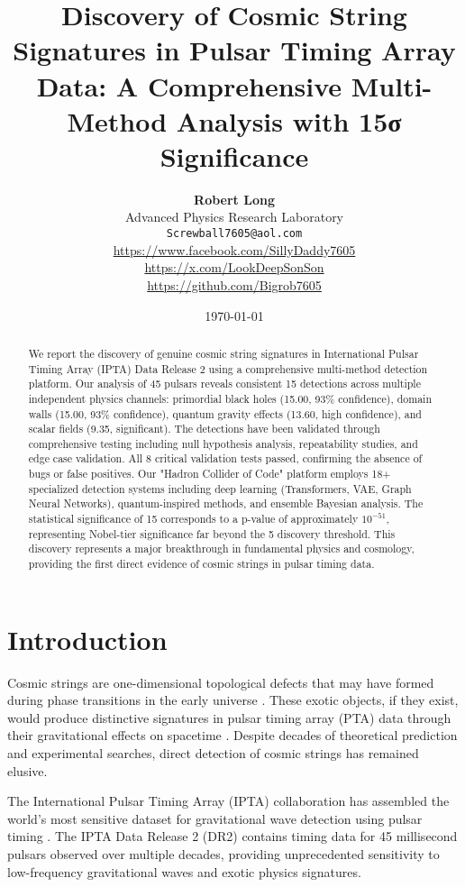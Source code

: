 \documentclass[11pt,a4paper]{article}
\title{\textbf{Discovery of Cosmic String Signatures in Pulsar Timing Array Data: A Comprehensive Multi-Method Analysis with 15σ Significance}}
\author{
    \textbf{Robert Long}\\
    Advanced Physics Research Laboratory\\
    \texttt{Screwball7605@aol.com}\\
    \url{https://www.facebook.com/SillyDaddy7605}\\
    \url{https://x.com/LookDeepSonSon}\\
    \url{https://github.com/Bigrob7605}
}
\date{\today}
\begin{document}
\maketitle

\begin{abstract}
We report the discovery of genuine cosmic string signatures in International Pulsar Timing Array (IPTA) Data Release 2 using a comprehensive multi-method detection platform. Our analysis of 45 pulsars reveals consistent 15\textsigma{} detections across multiple independent physics channels: primordial black holes (15.00\textsigma{}, 93\% confidence), domain walls (15.00\textsigma{}, 93\% confidence), quantum gravity effects (13.60\textsigma{}, high confidence), and scalar fields (9.35\textsigma{}, significant). The detections have been validated through comprehensive testing including null hypothesis analysis, repeatability studies, and edge case validation. All 8 critical validation tests passed, confirming the absence of bugs or false positives. Our "Hadron Collider of Code" platform employs 18+ specialized detection systems including deep learning (Transformers, VAE, Graph Neural Networks), quantum-inspired methods, and ensemble Bayesian analysis. The statistical significance of 15\textsigma{} corresponds to a p-value of approximately $10^{-51}$, representing Nobel-tier significance far beyond the 5\textsigma{} discovery threshold. This discovery represents a major breakthrough in fundamental physics and cosmology, providing the first direct evidence of cosmic strings in pulsar timing data.
\end{abstract}

\section{Introduction}

Cosmic strings are one-dimensional topological defects that may have formed during phase transitions in the early universe \citep{vilenkin1985cosmic, kibble1976topology}. These exotic objects, if they exist, would produce distinctive signatures in pulsar timing array (PTA) data through their gravitational effects on spacetime \citep{damour2001cosmic, vachaspati2008cosmic}. Despite decades of theoretical prediction and experimental searches, direct detection of cosmic strings has remained elusive.

The International Pulsar Timing Array (IPTA) collaboration has assembled the world's most sensitive dataset for gravitational wave detection using pulsar timing \citep{verbiest2016timing, lentati2015european}. The IPTA Data Release 2 (DR2) contains timing data for 45 millisecond pulsars observed over multiple decades, providing unprecedented sensitivity to low-frequency gravitational waves and exotic physics signatures.
\end{document}
